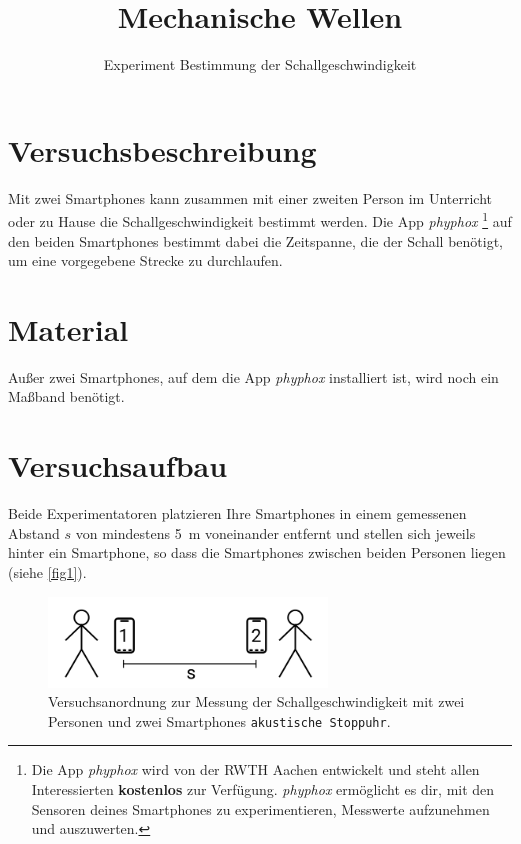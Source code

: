 \documentclass[12pt,oneside]{scrartcl}
\newcommand{\phyphox}{\textit{phyphox} }
\begin{document}
\sffamily

\title{Mechanische Wellen}
\subtitle{Experiment Bestimmung der Schallgeschwindigkeit}
\date{}
\maketitle
\section*{Versuchsbeschreibung}
Mit zwei Smartphones kann zusammen mit einer zweiten Person im Unterricht oder zu Hause die Schallgeschwindigkeit bestimmt werden. Die App \phyphox\footnote{Die App \phyphox wird von der RWTH Aachen entwickelt und steht allen Interessierten \textbf{kostenlos} zur Verfügung. \phyphox ermöglicht es dir, mit den Sensoren deines Smartphones zu experimentieren, Messwerte aufzunehmen und auszuwerten.}  auf den beiden Smartphones bestimmt dabei die Zeitspanne, die der Schall benötigt, um eine vorgegebene Strecke zu durchlaufen.
\section*{Material}
Außer zwei Smartphones, auf dem die App \phyphox installiert ist, wird noch ein Maßband benötigt.
\section*{Versuchsaufbau}
Beide Experimentatoren platzieren Ihre Smartphones in einem gemessenen Abstand $s$ von mindestens \SI{5}{\meter} voneinander entfernt und stellen sich jeweils hinter ein Smartphone, so dass die Smartphones zwischen beiden Personen liegen (siehe \autoref{fig1}).
\begin{figure}[ht]
	\centering
  \includegraphics[width=0.66\textwidth]{Messung.png}
	\caption{{\small Versuchsanordnung zur Messung der Schallgeschwindigkeit mit zwei Personen und zwei Smartphones \texttt{akustische Stoppuhr}.}}
	\label{fig1}
\end{figure}
\end{document}
